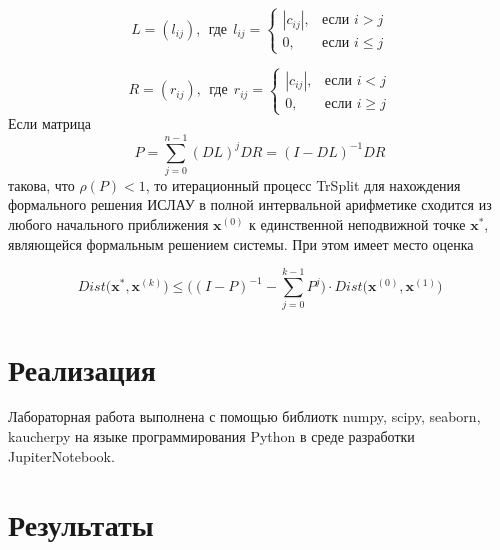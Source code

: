 \documentclass{article}
\begin{document}
        \begin{equation*}
            L = (l_{ij}), \ \ \text{где} \ \  l_{ij} =  \begin{cases}
                                               |c_{ij}|, &\text{если $i>j$}\\
                                               0, &\text{если $i \leq j$}
                                             \end{cases}
        \end{equation*}
        
        \begin{equation*}
            R = (r_{ij}), \ \ \text{где} \ \  r_{ij} =  \begin{cases}
                                               |c_{ij}|, &\text{если $i<j$}\\
                                               0, &\text{если $i \geq j$}
                                             \end{cases}
        \end{equation*}
        Если матрица
        \begin{equation*}
            P = \sum\limits_{j=0}^{n-1} (DL)^{j}DR = (I-DL)^{-1}DR
        \end{equation*}
        такова, что $\rho(P)<1$, то итерационный процесс TrSplit для нахождения формального решения ИСЛАУ в полной интервальной арифметике сходится из любого начального приближения $\textbf{x}^{(0)}$ к единственной неподвижной точке $\textbf{x}^*$, являющейся формальным решением системы. При этом имеет место оценка
        
        \begin{equation*}
            Dist\big(\textbf{x}^*, \textbf{x}^{(k)} \big) \leq \bigg( (I-P)^{-1} - \sum\limits_{j=0}^{k-1} P^j \bigg) \cdot Dist\big(\textbf{x}^{(0)}, \textbf{x}^{(1)} \big)
        \end{equation*}

        
    
    
\section{Реализация}
    Лабораторная работа выполнена с помощью библиотк numpy, scipy, seaborn, kaucherpy на языке программирования Python в среде разработки JupiterNotebook.
    
	\pagebreak
	
\section{Результаты}
\end{document}
